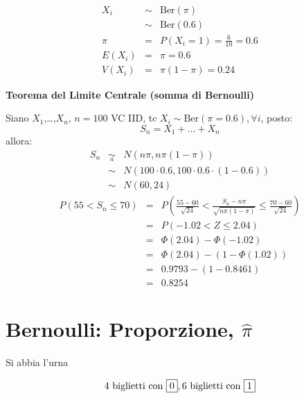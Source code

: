 \documentclass[
  11pt,
]{book}
\theoremstyle{mytheoremstyle}
\theoremstyle{mydefstyle}
\newenvironment{sol}
  {
  \begin{tcolorbox}[enhanced,breakable,arc=0.1mm,boxrule=1pt,colback=white,colframe=iblue,
  title=\bf \fontfamily{lmss}\selectfont \hspace{.5 cm} Soluzione,drop fuzzy shadow]

}{
\end{tcolorbox}
  }
\begin{document}
\begin{sol}
\begin{eqnarray*}
X_{i}         &\sim& \mbox{Ber}(\pi)         \\
              &\sim& \mbox{Ber}(0.6)        \\
\pi           &=& P(X_{i} = 1) = \frac{6} {10} = 0.6       \\
E(X_{i})      &=& \pi = 0.6                                \\
V(X_{i})      &=& \pi (1-\pi) = 0.24                      
\end{eqnarray*}

\textbf{Teorema del Limite Centrale (somma di Bernoulli)}

Siano \(X_1\),\ldots,\(X_n\), \(n=100\) VC IID, tc \(X_i\sim\text{Ber}(\pi=0.6)\)\(,\forall i\), posto:
\[
      S_n = X_1 + ... + X_n
      \]
allora:\begin{eqnarray*}
  S_n & \mathop{\sim}\limits_{a}& N(n\pi,n\pi(1-\pi)) \\
      &\sim & N(100\cdot0.6,100\cdot0.6\cdot(1-0.6)) \\
      &\sim & N(60,24)
  \end{eqnarray*}\begin{eqnarray*}
   P( 55 < S_n \leq  70 ) &=& P\left( \frac { 55  -  60 }{\sqrt{ 24 }} < \frac { S_n  -  n\pi }{ \sqrt{n\pi(1-\pi)} } \leq \frac { 70  -  60 }{\sqrt{ 24 }}\right)  \\
              &=& P\left(  -1.02  < Z \leq  2.04 \right) \\
              &=& \Phi( 2.04 )-\Phi( -1.02 )\\
              &=&  \Phi( 2.04 )-(1-\Phi( 1.02 )) \\ &=&  0.9793 -(1- 0.8461 ) \\ 
              &=&  0.8254 
   \end{eqnarray*}

\end{sol}

\section{\texorpdfstring{Bernoulli: Proporzione, \(\widehat{\pi}\)}{Bernoulli: Proporzione, \textbackslash widehat\{\textbackslash pi\}}}\label{bernoulli-proporzione-widehatpi}

Si abbia l'urna

\[4\text{ biglietti con } \fbox{0}, 6\text{ biglietti con } \fbox{1}\]
\end{document}
